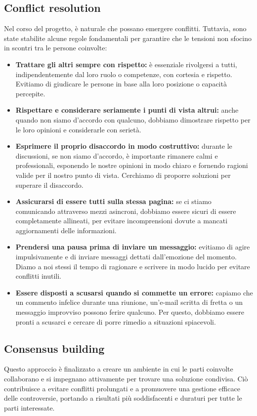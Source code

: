 \documentclass[oneside]{book}
\begin{document}
\subsection{Conflict resolution}
Nel corso del progetto, è naturale che possano emergere conflitti. Tuttavia, sono state stabilite alcune regole fondamentali per garantire che le tensioni non sfocino in scontri tra le persone coinvolte:

\begin{itemize}
    \item \textbf{Trattare gli altri sempre con rispetto:} è essenziale rivolgersi a tutti, indipendentemente dal loro ruolo o competenze, con cortesia e rispetto. Evitiamo di giudicare le persone in base alla loro posizione o capacità percepite.
    \item \textbf{Rispettare e considerare seriamente i punti di vista altrui:} anche quando non siamo d'accordo con qualcuno, dobbiamo dimostrare rispetto per le loro opinioni e considerarle con serietà.
    \item \textbf{Esprimere il proprio disaccordo in modo costruttivo:} durante le discussioni, se non siamo d'accordo, è importante rimanere calmi e professionali, esponendo le nostre opinioni in modo chiaro e fornendo ragioni valide per il nostro punto di vista. Cerchiamo di proporre soluzioni per superare il disaccordo.
    \item \textbf{Assicurarsi di essere tutti sulla stessa pagina:} se ci stiamo comunicando attraverso mezzi asincroni, dobbiamo essere sicuri di essere completamente allineati, per evitare incomprensioni dovute a mancati aggiornamenti delle informazioni.
    \item \textbf{Prendersi una pausa prima di inviare un messaggio:} evitiamo di agire impulsivamente e di inviare messaggi dettati dall'emozione del momento. Diamo a noi stessi il tempo di ragionare e scrivere in modo lucido per evitare conflitti inutili.
    \item \textbf{Essere disposti a scusarsi quando si commette un errore:} capiamo che un commento infelice durante una riunione, un'e-mail scritta di fretta o un messaggio improvviso possono ferire qualcuno. Per questo, dobbiamo essere pronti a scusarci e cercare di porre rimedio a situazioni spiacevoli.
\end{itemize}

\subsection{Consensus building}
Questo approccio è finalizzato a creare un ambiente in cui le parti coinvolte collaborano e si impegnano attivamente per trovare una soluzione condivisa. Ciò contribuisce a evitare conflitti prolungati e a promuovere una gestione efficace delle controversie, portando a risultati più soddisfacenti e duraturi per tutte le parti interessate.
\end{document}
